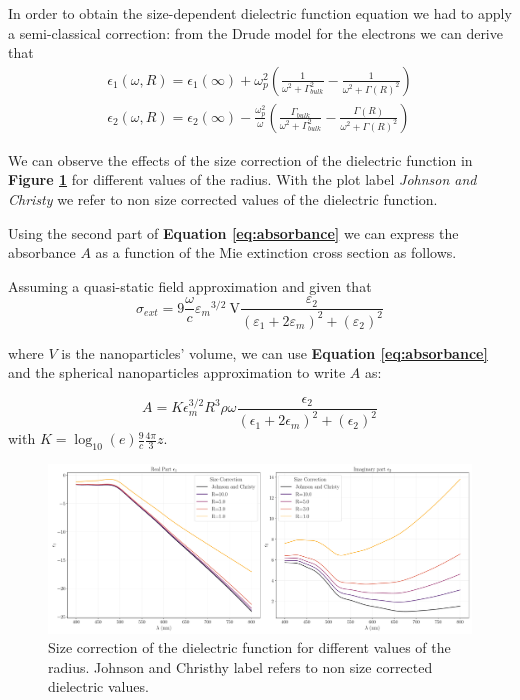 \documentclass[twocolumn]{article}
\begin{document}
\begin{multicols}{2}
\noindent
In order to obtain the size-dependent dielectric function equation we had to apply a semi-classical correction: from the Drude model for the electrons we can derive that
$$
\begin{array}{l}
\epsilon_{1}(\omega, R)=\epsilon_{1}(\infty)+\omega_{p}^{2}\left(\frac{1}{\omega^{2}+\Gamma_{bulk}^{2}}-\frac{1}{\omega^{2}+\Gamma(R)^{2}}\right) \\
\epsilon_{2}(\omega, R)=\epsilon_{2}(\infty)-\frac{\omega_{p}^{2}}{\omega}\left(\frac{\Gamma_{bulk}}{\omega^{2}+\Gamma_{bulk}^{2}}-\frac{\Gamma(R)}{\omega^{2}+\Gamma(R)^{2}}\right)
\end{array}
$$

\noindent
We can observe the effects of the size correction of the dielectric function in \textbf{Figure \ref{fig:size_correction}} for different values of the radius. With the plot label \textit{Johnson and Christy} we refer to non size corrected values of the dielectric function.

Using the second part of \textbf{Equation \ref{eq:absorbance}} we can express the absorbance $A$ as a function of the Mie extinction cross section as follows.

\noindent
Assuming a quasi-static field approximation and given that
\begin{equation}
\sigma_{e x t}=9 \frac{\omega}{c} \varepsilon_{m}{ }^{3 / 2} \mathrm{~V} \frac{\varepsilon_{2}}{\left(\varepsilon_{1}+2 \varepsilon_{m}\right)^{2}+\left(\varepsilon_{2}\right)^{2}}
\end{equation}

\noindent
where $V$ is the nanoparticles' volume, we can use \textbf{Equation \ref{eq:absorbance}} and the spherical nanoparticles approximation to write $A$ as:

\begin{equation}
    A=K\epsilon_m^{3/2}R^3\rho\omega\frac{\epsilon_2}{(\epsilon_1 + 2\epsilon_m)^2 + (\epsilon_2)^2}
    \label{eq:ass}
\end{equation}
with $K=\log_{10}(e)\frac{9}{c}\frac{4\pi}{3}z$.

\end{multicols}

\begin{figure}[H]
    \begin{minipage}[l]{1.0\columnwidth}
    \centering
    \includegraphics[width=\textwidth]{image/data/size_correction.pdf}
    \caption{Size correction of the dielectric function for different values of the radius. Johnson and Christhy label refers to non size corrected dielectric values.}
    \label{fig:size_correction}
    \end{minipage}
\end{figure}
\end{document}
